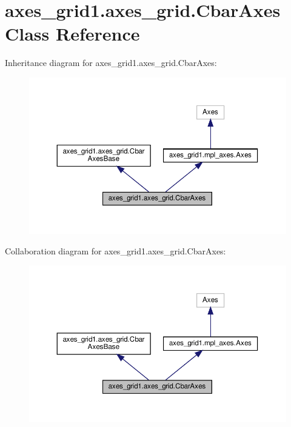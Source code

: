 \hypertarget{classaxes__grid1_1_1axes__grid_1_1CbarAxes}{}\section{axes\+\_\+grid1.\+axes\+\_\+grid.\+Cbar\+Axes Class Reference}
\label{classaxes__grid1_1_1axes__grid_1_1CbarAxes}


Inheritance diagram for axes\+\_\+grid1.\+axes\+\_\+grid.\+Cbar\+Axes\+:
\nopagebreak
\begin{figure}[H]
\begin{center}
\leavevmode
\includegraphics[width=350pt]{classaxes__grid1_1_1axes__grid_1_1CbarAxes__inherit__graph}
\end{center}
\end{figure}


Collaboration diagram for axes\+\_\+grid1.\+axes\+\_\+grid.\+Cbar\+Axes\+:
\nopagebreak
\begin{figure}[H]
\begin{center}
\leavevmode
\includegraphics[width=350pt]{classaxes__grid1_1_1axes__grid_1_1CbarAxes__coll__graph}
\end{center}
\end{figure}
